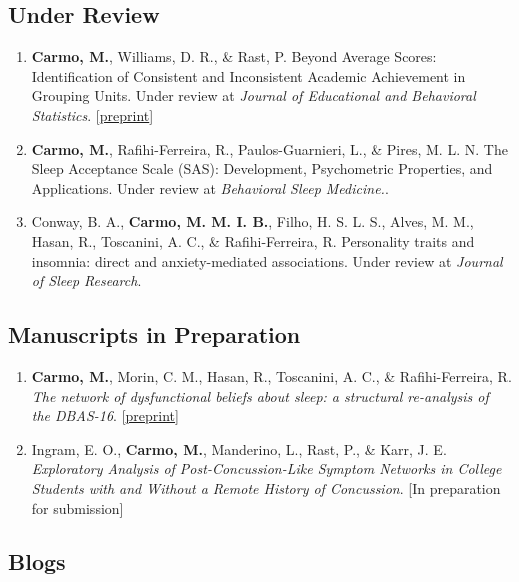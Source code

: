 \documentclass[10pt,]{article}
\begin{document}
\subsection{\texorpdfstring{\textbf{Under
Review}}{Under Review}}\label{under-review}

\begin{enumerate}
\def\labelenumi{\arabic{enumi}.}
\item
  \textbf{Carmo, M.}, Williams, D. R., \& Rast, P. Beyond Average
  Scores: Identification of Consistent and Inconsistent Academic
  Achievement in Grouping Units. Under review at \emph{Journal of
  Educational and Behavioral Statistics}.
  {[}\href{https://doi.org/10.31234/osf.io/sh6ne}{preprint}{]}
\item
  \textbf{Carmo, M.}, Rafihi-Ferreira, R., Paulos-Guarnieri, L., \&
  Pires, M. L. N. The Sleep Acceptance Scale (SAS): Development,
  Psychometric Properties, and Applications. Under review at
  \emph{Behavioral Sleep Medicine.}.
\item
  Conway, B. A., \textbf{Carmo, M. M. I. B.}, Filho, H. S. L. S., Alves,
  M. M., Hasan, R., Toscanini, A. C., \& Rafihi-Ferreira, R. Personality
  traits and insomnia: direct and anxiety-mediated associations. Under
  review at \emph{Journal of Sleep Research}.
\end{enumerate}

\subsection{\texorpdfstring{\textbf{Manuscripts in
Preparation}}{Manuscripts in Preparation}}\label{manuscripts-in-preparation}

\begin{enumerate}
\def\labelenumi{\arabic{enumi}.}
\item
  \textbf{Carmo, M.}, Morin, C. M., Hasan, R., Toscanini, A. C., \&
  Rafihi-Ferreira, R. \emph{The network of dysfunctional beliefs about
  sleep: a structural re-analysis of the DBAS-16}.
  {[}\href{https://osf.io/preprints/psyarxiv/6vuf3}{preprint}{]}
\item
  Ingram, E. O., \textbf{Carmo, M.}, Manderino, L., Rast, P., \& Karr,
  J. E. \emph{Exploratory Analysis of Post-Concussion-Like Symptom
  Networks in College Students with and Without a Remote History of
  Concussion}. {[}In preparation for submission{]}
\end{enumerate}

\subsection{\texorpdfstring{\textbf{Blogs}}{Blogs}}\label{blogs}
\end{document}
